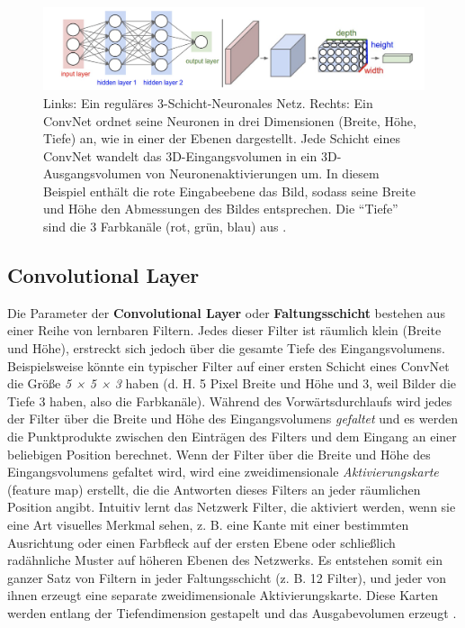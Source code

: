     \begin{figure}[H]
        \centering
        \includegraphics[width=13cm]{kapitel2/conv.png}
        \caption[Vergleich eines NN mit einem CNN]{Links: Ein reguläres 3-Schicht-Neuronales Netz. Rechts: Ein ConvNet ordnet seine Neuronen in drei Dimensionen (Breite, Höhe, Tiefe) an, wie in einer der Ebenen dargestellt. Jede Schicht eines ConvNet wandelt das 3D-Eingangsvolumen in ein 3D-Ausgangsvolumen von Neuronenaktivierungen um. In diesem Beispiel enthält die rote Eingabeebene das Bild, sodass seine Breite und Höhe den Abmessungen des Bildes entsprechen. Die \enquote{Tiefe} sind die 3 Farbkanäle (rot, grün, blau) aus \cite*{StanfordUniversityCoursecs231n2018a}.}
        \label{Kap2:Conv}
    \end{figure}


    \subsection{Convolutional Layer}

    Die Parameter der  \textbf{Convolutional Layer} oder \textbf{Faltungsschicht} bestehen aus einer Reihe von lernbaren Filtern. Jedes dieser Filter ist räumlich klein (Breite und Höhe), erstreckt sich jedoch über die gesamte Tiefe des Eingangsvolumens. Beispielsweise könnte ein typischer Filter auf einer ersten Schicht eines ConvNet die Größe \textit{5 × 5 × 3} haben (d. H. 5 Pixel Breite und Höhe und 3, weil Bilder die Tiefe 3 haben, also die Farbkanäle). Während des Vorwärtsdurchlaufs wird jedes der Filter über die Breite und Höhe des Eingangsvolumens \textit{gefaltet} und es werden die Punktprodukte zwischen den Einträgen des Filters und dem Eingang an einer beliebigen Position berechnet. Wenn der Filter über die Breite und Höhe des Eingangsvolumens gefaltet wird, wird eine zweidimensionale \textit{Aktivierungskarte} (feature map) erstellt, die die Antworten dieses Filters an jeder räumlichen Position angibt. Intuitiv lernt das Netzwerk Filter, die aktiviert werden, wenn sie eine Art visuelles Merkmal sehen, z. B. eine Kante mit einer bestimmten Ausrichtung oder einen Farbfleck auf der ersten Ebene oder schließlich radähnliche Muster auf höheren Ebenen des Netzwerks. Es entstehen somit ein ganzer Satz von Filtern in jeder Faltungsschicht (z. B. 12 Filter), und jeder von ihnen erzeugt eine separate zweidimensionale Aktivierungskarte. Diese Karten werden entlang der Tiefendimension gestapelt und das Ausgabevolumen erzeugt \cite*{StanfordUniversityCoursecs231n2018a}.

